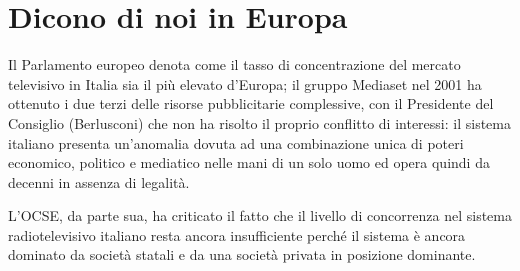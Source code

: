 \section{Dicono di noi in Europa}

Il Parlamento europeo denota come il tasso di concentrazione del mercato televisivo in Italia sia il più elevato d’Europa; il gruppo Mediaset nel 2001 ha ottenuto i due terzi delle risorse pubblicitarie complessive, con il Presidente del Consiglio (Berlusconi) che non ha risolto il proprio conflitto di interessi: il sistema italiano presenta un’anomalia dovuta ad una combinazione unica di poteri economico, politico e mediatico nelle mani di un solo uomo ed opera quindi da decenni in assenza di legalità. 

L’OCSE, da parte sua, ha criticato il fatto che il livello di concorrenza nel sistema radiotelevisivo italiano resta ancora insufficiente perché il sistema è ancora dominato da società statali e da una società privata in posizione dominante.